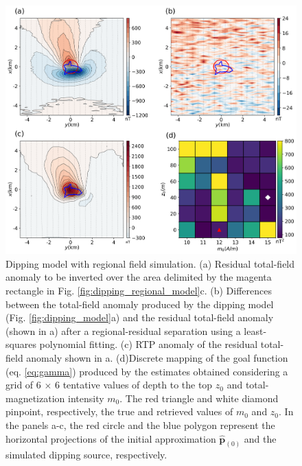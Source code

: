 \begin{figure}
    \centering
    \includegraphics[width=\linewidth]{figures/regional_rtp.png}
    \caption{Dipping model with regional field simulation. (a) Residual total-field anomaly to be inverted over the area delimited by the  magenta rectangle 
    in Fig. \ref{fig:dipping_regional_model}c. 
    (b) Differences between the total-field anomaly produced by the dipping model
(Fig. \ref{fig:dipping_model}a) and the residual total-field anomaly (shown in a) after a regional-residual separation using a least-squares polynomial fitting. 
(c) RTP anomaly of the  residual total-field anomaly shown in a. 
(d)Discrete mapping of the goal function (eq. \ref{eq:gamma}) produced by the estimates   	       obtained considering a grid of 6 $\times$ 6 tentative values of 
	   depth to the top $z_0$ and total-magnetization intensity $m_0$. 
	   The red triangle  and white diamond pinpoint, respectively, the true and retrieved 	   
	   values of $m_0$  and $z_0$.   
	   In the panels a-c, the red circle and the blue polygon represent the horizontal projections 	of the initial approximation $\hat{\mathbf{p}}_{(0)}$ and  the simulated dipping source, respectively.
}
    \label{fig:dipping_regional_rtp}
\end{figure}


